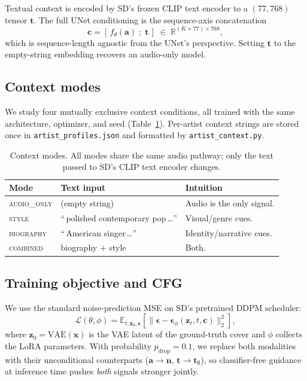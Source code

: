 \documentclass{article}
\begin{document}
Textual context is encoded by SD's frozen CLIP text encoder to a $(77, 768)$
tensor $\mathbf{t}$. The full UNet conditioning is the sequence-axis
concatenation
\[
  \mathbf{c} = [\,f_\theta(\mathbf{a})\;;\;\mathbf{t}\,]
  \;\in\;\mathbb{R}^{(K+77)\times 768},
\]
which is sequence-length agnostic from the UNet's perspective. Setting
$\mathbf{t}$ to the empty-string embedding recovers an audio-only model.

\subsection{Context modes}
\label{sec:modes}
We study four mutually exclusive context conditions, all trained with the
same architecture, optimizer, and seed (Table~\ref{tab:modes}). Per-artist
context strings are stored once in \texttt{artist\_profiles.json} and
formatted by \texttt{artist\_context.py}.

\begin{table}[H]
\centering
\caption{Context modes. All modes share the same audio pathway; only the
text passed to SD's CLIP text encoder changes.}
\label{tab:modes}
\begin{tabular}{lll}
\toprule
Mode & Text input & Intuition \\
\midrule
\textsc{audio\_only} & (empty string) & Audio is the only signal. \\
\textsc{style}       & ``\,polished contemporary pop\,\ldots'' & Visual/genre cues. \\
\textsc{biography}   & ``\,American singer\,\ldots'' & Identity/narrative cues. \\
\textsc{combined}    & biography $+$ style & Both. \\
\bottomrule
\end{tabular}
\end{table}

\subsection{Training objective and CFG}
We use the standard noise-prediction MSE on SD's pretrained DDPM
scheduler:
\[
  \mathcal{L}(\theta, \phi) = \mathbb{E}_{t,\mathbf{z}_0,\boldsymbol{\epsilon}}\!\left[
    \big\lVert \boldsymbol{\epsilon} - \boldsymbol{\epsilon}_\phi(\mathbf{z}_t, t, \mathbf{c})\big\rVert_2^2
  \right],
\]
where $\mathbf{z}_0 = \mathrm{VAE}(\mathbf{x})$ is the VAE latent of the
ground-truth cover and $\phi$ collects the LoRA parameters. With probability
$p_{\text{drop}}=0.1$, we replace both modalities with their unconditional
counterparts ($\mathbf{a}\!\to\!\mathbf{n}$,
$\mathbf{t}\!\to\!\mathbf{t}_\emptyset$), so classifier-free guidance at
inference time pushes \emph{both} signals stronger jointly.
\end{document}
